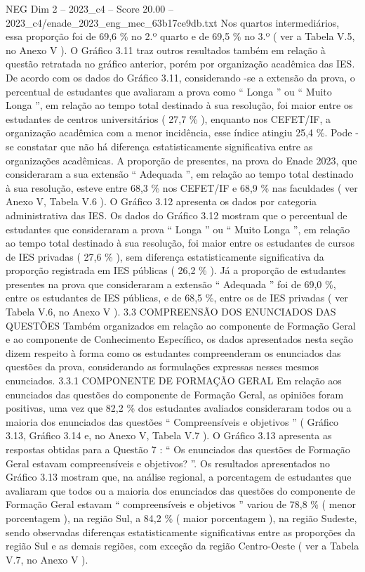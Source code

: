 \begin{textsample}{NEG Dim 2 – 2023\_c4 – Score 20.00 – 2023\_c4/enade\_2023\_eng\_mec\_63b17ce9db.txt}
Nos quartos intermediários, essa proporção foi de 69,6 \% no 2.º quarto e de 69,5 \% no 3.º ( ver a Tabela V.5, no Anexo V ).
O Gráfico 3.11 traz outros resultados também em relação à questão retratada no gráfico anterior, porém por organização acadêmica das IES.
De acordo com os dados do Gráfico 3.11, considerando -se a extensão da prova, o percentual de estudantes que avaliaram a prova como “ Longa ” ou “ Muito Longa ”, em relação ao tempo total destinado à sua resolução, foi maior entre os estudantes de centros universitários ( 27,7 \% ), enquanto nos CEFET/IF, a organização acadêmica com a menor incidência, esse índice atingiu 25,4 \%.
Pode -se constatar que não há diferença estatisticamente significativa entre as organizações acadêmicas.
A proporção de presentes, na prova do Enade 2023, que consideraram a sua extensão “ Adequada ”, em relação ao tempo total destinado à sua resolução, esteve entre 68,3 \% nos CEFET/IF e 68,9 \% nas faculdades ( ver Anexo V, Tabela V.6 ).
O Gráfico 3.12 apresenta os dados por categoria administrativa das IES.
Os dados do Gráfico 3.12 mostram que o percentual de estudantes que consideraram a prova “ Longa ” ou “ Muito Longa ”, em relação ao tempo total destinado à sua resolução, foi maior entre os estudantes de cursos de IES privadas ( 27,6 \% ), sem diferença estatisticamente significativa da proporção registrada em IES públicas ( 26,2 \% ).
Já a proporção de estudantes presentes na prova que consideraram a extensão “ Adequada ” foi de 69,0 \%, entre os estudantes de IES públicas, e de 68,5 \%, entre os de IES privadas ( ver Tabela V.6, no Anexo V ). 3.3 COMPREENSÃO DOS ENUNCIADOS DAS QUESTÕES Também organizados em relação ao componente de Formação Geral e ao componente de Conhecimento Específico, os dados apresentados nesta seção dizem respeito à forma como os estudantes compreenderam os enunciados das questões da prova, considerando as formulações expressas nesses mesmos enunciados. 3.3.1 COMPONENTE DE FORMAÇÃO GERAL Em relação aos enunciados das questões do componente de Formação Geral, as opiniões foram positivas, uma vez que 82,2 \% dos estudantes avaliados consideraram todos ou a maioria dos enunciados das questões “ Compreensíveis e objetivos ” ( Gráfico 3.13, Gráfico 3.14 e, no Anexo V, Tabela V.7 ).
O Gráfico 3.13 apresenta as respostas obtidas para a Questão 7 : “ Os enunciados das questões de Formação Geral estavam compreensíveis e objetivos? ”.
Os resultados apresentados no Gráfico 3.13 mostram que, na análise regional, a porcentagem de estudantes que avaliaram que todos ou a maioria dos enunciados das questões do componente de Formação Geral estavam “ compreensíveis e objetivos ” variou de 78,8 \% ( menor porcentagem ), na região Sul, a 84,2 \% ( maior porcentagem ), na região Sudeste, sendo observadas diferenças estatisticamente significativas entre as proporções da região Sul e as demais regiões, com exceção da região Centro-Oeste ( ver a Tabela V.7, no Anexo V ).

\end{textsample}
